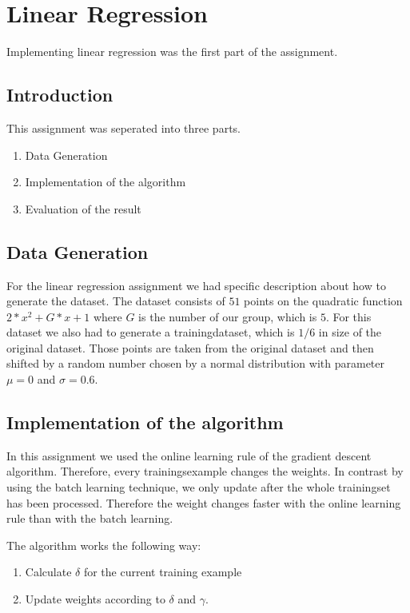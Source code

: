 \section{Linear Regression}

Implementing linear regression was the first part of the assignment.

\subsection{Introduction}

This assignment was seperated into three parts.
\begin{enumerate}
	\item Data Generation
	\item Implementation of the algorithm
	\item Evaluation of the result
\end{enumerate}

\subsection{Data Generation}
\label{sec:dataGen}

For the linear regression assignment we had specific description about how to generate the dataset. The dataset consists of $51$ points on the quadratic function $2*x^2 + G*x + 1$ where $G$ is the number of our group, which is $5$. For this dataset we also had to generate a trainingdataset, which is $1/6$ in size of the original dataset. Those points are taken from the original dataset and then shifted by a random number chosen by a normal distribution with parameter $\mu = 0$ and $\sigma = 0.6$.

\subsection{Implementation of the algorithm}

In this assignment we used the online learning rule of the gradient descent algorithm. Therefore, every trainingsexample changes the weights. In contrast by using the batch learning technique, we only update after the whole trainingset has been processed. Therefore the weight changes faster with the online learning rule than with the batch learning.

The algorithm works the following way:
\begin{enumerate}
	\item Calculate $\delta$ for the current training example
	\item Update weights according to $\delta$ and $\gamma$.
\end{enumerate}

